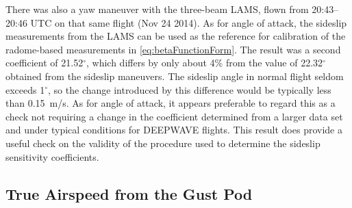 \documentclass[12pt,twoside,english]{article}\usepackage[]{graphicx}\usepackage[]{color}
\begin{document}
There was also a yaw maneuver with the three-beam LAMS, flown from 20:43--20:46 UTC
on that same flight (Nov 24 2014). As for angle of attack, the sideslip measurements
from the LAMS can be used as the reference for calibration of the radome-based 
measurements in \eqref{eq:betaFunctionForm}. The result was a second coefficient of 21.52$^{\circ}$, which differs by only about 4\% from the value of 22.32$^{\circ}$ obtained from the sideslip maneuvers. The sideslip angle in normal flight seldom exceeds 1$^{\circ}$, so
the change introduced by this difference would be typically less than 0.15~m/s. As for
angle of attack, it appears preferable to regard this as a check not requiring a change
in the coefficient determined from a larger data set and under typical conditions for
DEEPWAVE flights. This result does provide a useful check on the validity of the
procedure used to determine the sideslip sensitivity coefficients.

\subsection{True Airspeed from the Gust Pod\label{sub:GP-TAS}}

\end{document}
